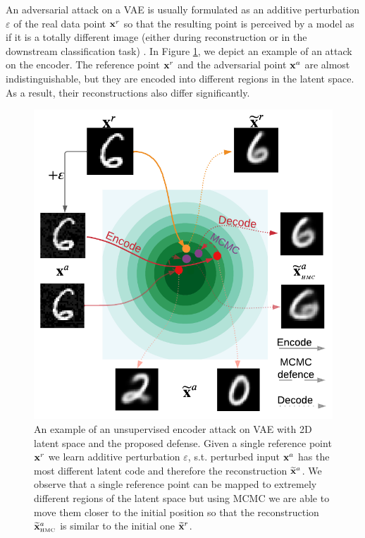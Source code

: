 An adversarial attack on a VAE is usually formulated as an additive perturbation $\varepsilon$ of the real data point ${\mathbf{x}}^r$ so that the resulting point is perceived by a model as if it is a totally different image (either during reconstruction or in the downstream classification task) \cite{Gondim-Ribeiro2018-cu}. In Figure \ref{fig:toy_exaple}, we depict an example of an attack on the encoder. The reference point ${\mathbf{x}}^r$ and the adversarial point ${\mathbf{x}}^a$ are almost indistinguishable, but they are encoded into different regions in the latent space. As a result, their reconstructions also differ significantly.

\begin{figure}[t]
	\begin{center}
		\includegraphics[width=0.6\linewidth]{pics/3_adv_att/Figure_1_upd.pdf}
		\caption{An example of an unsupervised encoder attack on VAE with 2D latent space and the proposed defense. 
			Given a single reference point ${\mathbf{x}}^r$ we learn additive perturbation $\varepsilon$, s.t. perturbed input ${\mathbf{x}}^a$ has the most different latent code and therefore the reconstruction $\widetilde{{\mathbf{x}}}^a$. 
			We observe that a single reference point can be mapped to extremely different regions of the latent space but using MCMC we are able to move them closer to the initial position so that the reconstruction $\widetilde{\rvx}^a_{\text{\tiny{HMC}}}$ is similar to the initial one $\widetilde{{\mathbf{x}}}^r$.}
		\label{fig:toy_exaple}
	\end{center}
\end{figure}

